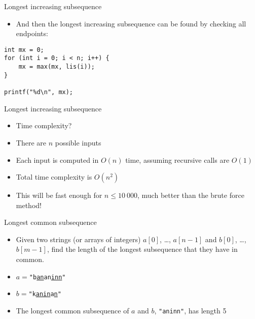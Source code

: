    \begin{frame}[fragile]{Longest increasing subsequence}

    \begin{itemize}
        \item And then the longest increasing subsequence can be found by checking all endpoints:
    \end{itemize}

    \begin{lstlisting}
int mx = 0;
for (int i = 0; i < n; i++) {
    mx = max(mx, lis(i));
}

printf("%d\n", mx);
    \end{lstlisting}
\end{frame}

   \begin{frame}[fragile]{Longest increasing subsequence}

    \begin{itemize}
        \item Time complexity?

        \item There are $n$ possible inputs
        \item Each input is computed in $O(n)$ time, assuming recursive calls are $O(1)$
        \item Total time complexity is $O(n^2)$

        \item This will be fast enough for $n \leq 10\ 000$, much better than the brute force method!
    \end{itemize}
\end{frame}

   \begin{frame}[fragile]{Longest common subsequence}

    \begin{itemize}
\item Given two strings (or arrays of integers) $a[0]$, \ldots, $a[n-1]$ and $b[0]$, \ldots, $b[m-1]$, find the length of the longest subsequence that they have in common.
\item $a = $\texttt{"b\underline{an}an\underline{inn}"}
\item $b = $\texttt{"k\underline{anin}a\underline{n}"}
\item The longest common subsequence of $a$ and $b$, \texttt{"aninn"}, has length 5
    \end{itemize}
\end{frame}

